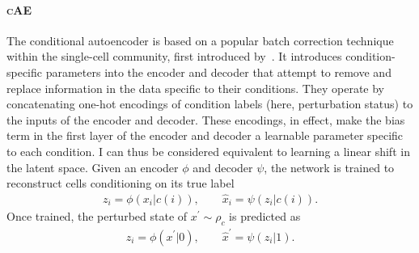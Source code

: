 \paragraph{\textsc{cAE}}
The conditional autoencoder is based on a popular batch correction technique within the single-cell community, first introduced by~\citep{Lopez2018scvi}.
It introduces condition-specific parameters into the encoder and decoder that attempt to remove and replace information in the data specific to their conditions.
They operate by concatenating one-hot encodings of condition labels (here, perturbation status) to the inputs of the encoder and decoder.
These encodings, in effect, make the bias term in the first layer of the encoder and decoder a learnable parameter specific to each condition. I can thus be considered equivalent to learning a linear shift in the latent space.
Given an encoder $\phi$ and decoder $\psi$, the network is trained to reconstruct cells conditioning on its true label
\begin{align*}
    z_i = \phi( x_i | c(i)), \quad \quad \hat{x}_i = \psi(z_i | c(i)).
\end{align*}
Once trained, the perturbed state of $x^\prime \sim \rho_c$ is predicted as
\begin{align*}
        z_i = \phi( x^\prime | 0), \quad \quad \hat{x}^\prime = \psi(z_i | 1).
\end{align*}
